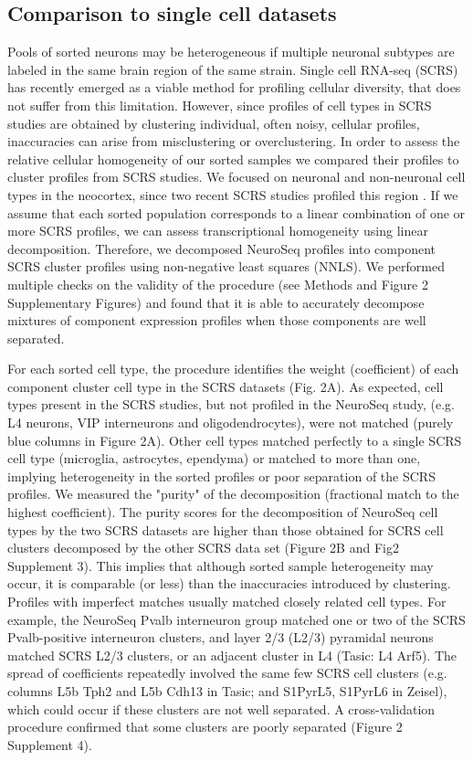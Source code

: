 \subsection{Comparison to single cell datasets}
Pools of sorted neurons may be heterogeneous if multiple neuronal subtypes are labeled in the same brain region of the same strain. Single cell RNA-seq (SCRS) has recently emerged as a viable method for profiling cellular diversity, that does not suffer from this limitation. However, since profiles of cell types in SCRS studies are obtained by clustering individual, often noisy, cellular profiles, inaccuracies can arise from misclustering or overclustering. In order to assess the relative cellular homogeneity of our sorted samples we compared their profiles to cluster profiles from SCRS studies. We focused on neuronal and non-neuronal cell types in the neocortex, since two recent SCRS studies profiled this region \cite{Tasic_2016,Zeisel_2015}. If we assume that each sorted population corresponds to a linear combination of one or more SCRS profiles, we can assess transcriptional homogeneity using linear decomposition. Therefore, we decomposed NeuroSeq profiles into component SCRS cluster profiles using non-negative least squares (NNLS). We performed multiple checks on the validity of the procedure (see Methods and Figure 2 Supplementary Figures) and found that it is able to accurately decompose mixtures of component expression profiles when those components are well separated. 

For each sorted cell type, the procedure identifies the weight (coefficient) of each component cluster cell type in the SCRS datasets (Fig. 2A). As expected, cell types present in the SCRS studies, but not profiled in the NeuroSeq study, (e.g. L4 neurons, VIP interneurons and oligodendrocytes), were not matched (purely blue columns in Figure 2A). Other cell types matched perfectly to a single SCRS cell type (microglia, astrocytes, ependyma) or matched to more than one, implying heterogeneity in the sorted profiles or poor separation of the SCRS profiles. We measured the "purity" of the decomposition (fractional match to the highest coefficient). The purity scores for the decomposition of NeuroSeq cell types by the two SCRS datasets are higher than those obtained for SCRS cell clusters decomposed by the other SCRS data set (Figure 2B and Fig2 Supplement 3). This implies that although sorted sample heterogeneity may occur, it is comparable (or less) than the inaccuracies introduced by clustering. Profiles with imperfect matches usually matched closely related cell types. For example, the NeuroSeq Pvalb interneuron group matched one or two of the SCRS Pvalb-positive interneuron clusters, and layer 2/3 (L2/3) pyramidal neurons matched SCRS L2/3 clusters, or an adjacent cluster in L4 (Tasic: L4 Arf5). The spread of coefficients repeatedly involved the same few SCRS cell clusters (e.g. columns L5b Tph2 and L5b Cdh13 in Tasic; and S1PyrL5,  S1PyrL6 in Zeisel), which could occur if these clusters are not well separated. A cross-validation procedure confirmed that some clusters are poorly separated (Figure 2 Supplement 4).   

